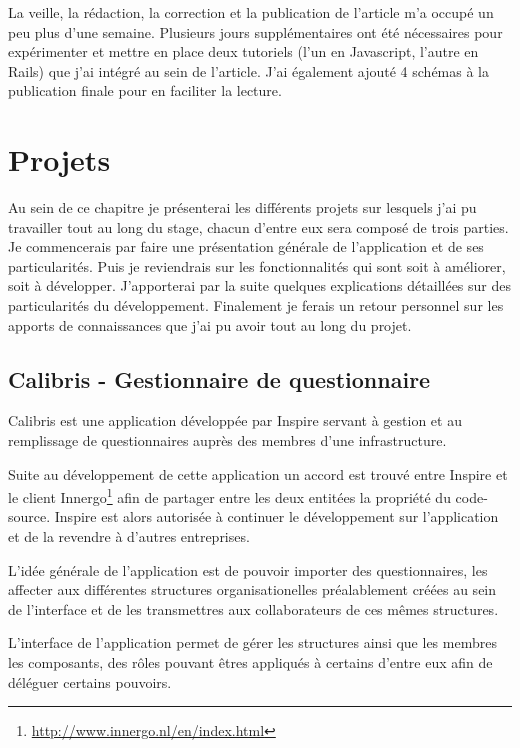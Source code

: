 \documentclass[12pt,a4paper]{book}
\begin{document}
La veille, la rédaction, la correction et la publication de l'article m'a occupé un peu plus d'une semaine. Plusieurs jours supplémentaires ont été nécessaires pour expérimenter et mettre en place deux tutoriels (l'un en Javascript, l'autre en Rails) que j'ai intégré au sein de l'article. J'ai également ajouté 4 schémas à la publication finale pour en faciliter la lecture.

\chapter{Projets}

Au sein de ce chapitre je présenterai les différents projets sur lesquels j'ai pu travailler tout au long du stage, chacun d'entre eux sera composé de trois parties. Je commencerais par faire une présentation générale de l'application et de ses particularités. Puis je reviendrais sur les fonctionnalités qui sont soit à améliorer, soit à développer. J'apporterai par la suite quelques explications détaillées sur des particularités du développement. Finalement je ferais un retour personnel sur les apports de connaissances que j'ai pu avoir tout au long du projet.

\section{Calibris - Gestionnaire de questionnaire}

\label{sec:calibris}
Calibris est une application développée par Inspire servant à gestion et au remplissage de questionnaires auprès des membres d'une infrastructure.

Suite au développement de cette application un accord est trouvé entre Inspire et le client Innergo\footnote{\url{http://www.innergo.nl/en/index.html}} afin de partager entre les deux entitées la propriété du code-source. Inspire est alors autorisée à continuer le développement sur l'application et de la revendre à d'autres entreprises.

L'idée générale de l'application est de pouvoir importer des questionnaires, les affecter aux différentes structures organisationelles préalablement créées au sein de l'interface et de les transmettres aux collaborateurs de ces mêmes structures. 

L'interface de l'application permet de gérer les structures ainsi que les membres les composants, des rôles pouvant êtres appliqués à certains d'entre eux afin de déléguer certains pouvoirs. 
\end{document}
